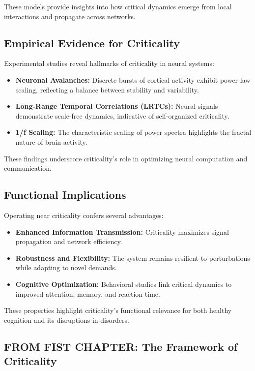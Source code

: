 These models provide insights into how critical dynamics emerge from local interactions and propagate across networks.

\subsection*{Empirical Evidence for Criticality}

Experimental studies reveal hallmarks of criticality in neural systems:
\begin{itemize}
    \item \textbf{Neuronal Avalanches:} Discrete bursts of cortical activity exhibit power-law scaling, reflecting a balance between stability and variability.
    \item \textbf{Long-Range Temporal Correlations (LRTCs):} Neural signals demonstrate scale-free dynamics, indicative of self-organized criticality.
    \item \textbf{1/f Scaling:} The characteristic scaling of power spectra highlights the fractal nature of brain activity.
\end{itemize}

These findings underscore criticality’s role in optimizing neural computation and communication.

\subsection*{Functional Implications}

Operating near criticality confers several advantages:
\begin{itemize}
    \item \textbf{Enhanced Information Transmission:} Criticality maximizes signal propagation and network efficiency.
    \item \textbf{Robustness and Flexibility:} The system remains resilient to perturbations while adapting to novel demands.
    \item \textbf{Cognitive Optimization:} Behavioral studies link critical dynamics to improved attention, memory, and reaction time.
\end{itemize}

These properties highlight criticality’s functional relevance for both healthy cognition and its disruptions in disorders.

\subsection{FROM FIST CHAPTER: The Framework of Criticality}


